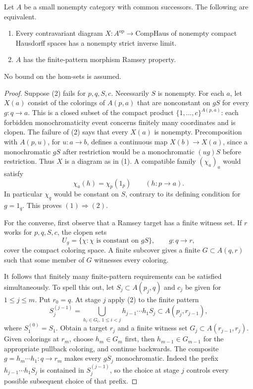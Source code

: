 \begin{theorem}
\label{CD:compact-Ramsey}
Let $A$ be a small nonempty category with common successors. The following
are equivalent.
\begin{enumerate}
\item Every contravariant diagram $X:A^{\mathrm{op}}\to
\mathrm{CompHaus}$ of nonempty compact Hausdorff spaces has a nonempty
strict inverse limit.
\item $A$ has the finite-pattern morphism Ramsey property.
\end{enumerate}
No bound on the hom-sets is assumed.
\end{theorem}
\begin{proof}
Suppose (2) fails for $p,q,S,c$. Necessarily $S$ is nonempty. For
each $a$, let $X(a)$ consist of the colorings of $A(p,a)$ that are
nonconstant on $gS$ for every $g:q\to a$. This is a closed subset of
the compact product $\{1,\ldots,c\}^{A(p,a)}$: each forbidden
monochromaticity event concerns finitely many coordinates and is clopen.
The failure of (2) says that every $X(a)$ is nonempty. Precomposition
with $A(p,u)$, for $u:a\to b$, defines a continuous map
$X(b)\to X(a)$, since a monochromatic $gS$ after restriction would be
a monochromatic $(ug)S$ before restriction. Thus $X$ is a diagram
as in (1). A compatible family $(\chi_a)_a$ would satisfy
\[
 \chi_a(h)=\chi_p(1_p)\qquad(h:p\to a).
\]
In particular $\chi_q$ would be constant on $S$, contrary to its
defining condition for $g=1_q$. This proves $(1)\Rightarrow(2)$.

For the converse, first observe that a Ramsey target has a finite
witness set. If $r$ works for $p,q,S,c$, the clopen sets
\[
 U_g=\{\chi:\chi\text{ is constant on }gS\},\qquad g:q\to r,
\]
cover the compact coloring space. A finite subcover gives a finite
$G\subset A(q,r)$ such that some member of $G$ witnesses every
coloring.

It follows that finitely many finite-pattern requirements can be
satisfied simultaneously. To spell this out, let
$S_j\subset A(p_j,q)$ and $c_j$ be given for $1\leq j\leq m$.
Put $r_0=q$. At stage $j$ apply (2) to the finite pattern
\[
 S_j^{(j-1)}=
 \bigcup_{h_i\in G_i,\,1\leq i<j}h_{j-1}\cdots h_1S_j
 \subset A(p_j,r_{j-1}),
\]
where $S_1^{(0)}=S_1$. Obtain a target $r_j$ and a finite witness
set $G_j\subset A(r_{j-1},r_j)$. Given colorings at $r_m$, choose
$h_m\in G_m$ first, then $h_{m-1}\in G_{m-1}$ for the appropriate
pullback coloring, and continue backwards. The composite
$g=h_m\cdots h_1:q\to r_m$ makes every $gS_j$ monochromatic.
Indeed the prefix $h_{j-1}\cdots h_1S_j$ is contained in
$S_j^{(j-1)}$, so the choice at stage $j$ controls every possible
subsequent choice of that prefix.


\end{proof}
